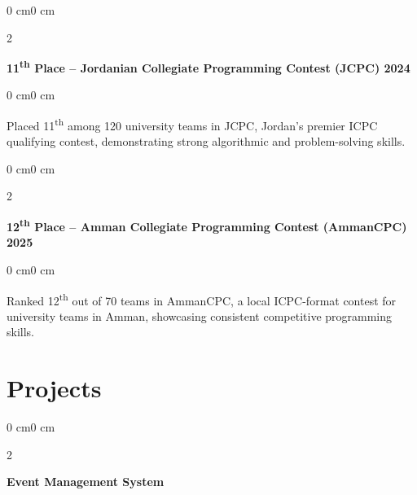 \documentclass[10pt, letterpaper]{article}
\newenvironment{onecolentry}{
    \begin{adjustwidth}{0 cm}{0 cm}
}{
    \end{adjustwidth}
}
\newenvironment{twocolentry}[2][]{
    \onecolentry
    \def\secondColumn{#2}
    \setcolumnwidth{\fill, 4.5 cm}
    \begin{paracol}{2}
}{
    \switchcolumn \raggedleft \secondColumn
    \end{paracol}
    \endonecolentry
}
\begin{document}
        \vspace{0.2 cm}
        \begin{twocolentry}{}
            \textbf{11\textsuperscript{th} Place -- Jordanian Collegiate Programming Contest (JCPC) 2024}
        \end{twocolentry}
        \begin{onecolentry}
            Placed 11\textsuperscript{th} among 120 university teams in JCPC, Jordan's premier ICPC qualifying contest, demonstrating strong algorithmic and problem-solving skills.
        \end{onecolentry}

        \vspace{0.2 cm}
        \begin{twocolentry}{}
            \textbf{12\textsuperscript{th} Place -- Amman Collegiate Programming Contest (AmmanCPC) 2025}
        \end{twocolentry}
        \begin{onecolentry}
            Ranked 12\textsuperscript{th} out of 70 teams in AmmanCPC, a local ICPC-format contest for university teams in Amman, showcasing consistent competitive programming skills.
        \end{onecolentry}

        \vspace{0.5cm}

     \section{Projects}
        \vspace{0.2cm}
        
        \begin{twocolentry}{}
            \textbf{Event Management System}
        \end{twocolentry}
        
\end{document}
